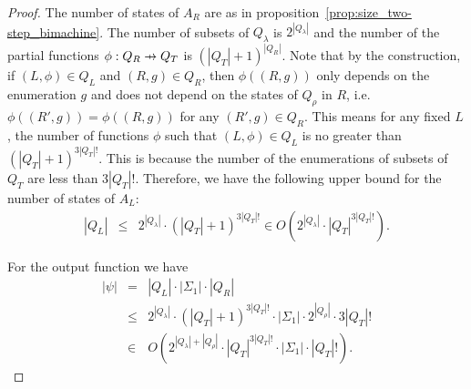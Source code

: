 \documentclass{article}
\newcommand{\len}[1]{\ensuremath{\left| #1 \right|}}
\newcommand\pfun{\mathrel{\ooalign{\hfil$\mapstochar\mkern5mu$\hfil\cr$\to$\cr}}}
\begin{document}
	\begin{proof}
		The number of states of $A_R$ are as in proposition~\ref{prop:size_two-step_bimachine}.
		The number of subsets of $Q_\lambda$ is $2^{\len{Q_\lambda}}$ and the number of the partial functions $\phi: Q_R\pfun Q_T$ is $(\len{Q_T}+1)^{\len{Q_R}}$.
		Note that by the construction, if $(L, \phi)\in Q_L$ and $(R, g)\in Q_R$, then $\phi((R, g))$ only depends on the enumeration $g$ and does not depend on the states of $Q_\rho$ in $R$, i.e.\ $\phi((R', g)) = \phi((R, g))$ for any $(R', g)\in Q_R$.
		This means for any fixed $L$, the number of functions $\phi$ such that $(L, \phi)\in Q_L$ is no greater than $(\len{Q_T}+1)^{3\len{Q_T}!}$.
		This is because the number of the enumerations of subsets of $Q_T$ are less than $3\len{Q_T}!$.
		Therefore, we have the following upper bound for the number of states of $A_L$:
		\begin{eqnarray*}
			\len{Q_L} %
				&\le& 2^{\len{Q_\lambda}}\cdot (\len{Q_T}+1)^{3\len{Q_T}!} \in O(2^{\len{Q_\lambda}}\cdot \len{Q_T}^{3\len{Q_T}!}).
		\end{eqnarray*}
		
		For the output function	we have
		\begin{eqnarray*}
			\len{\psi} &=& \len{Q_L}\cdot \len{\Sigma_1}\cdot \len{Q_R} \\
				&\le& 2^{\len{Q_\lambda}}\cdot (\len{Q_T}+1)^{3\len{Q_T}!}\cdot \len{\Sigma_1}\cdot 2^{\len{Q_\rho}}\cdot 3\len{Q_T}! \\
				&\in& O(2^{\len{Q_\lambda}+\len{Q_\rho}}\cdot \len{Q_T}^{3\len{Q_T}!}\cdot \len{\Sigma_1}\cdot \len{Q_T}!).
		\end{eqnarray*}
	\end{proof}
\end{document}
